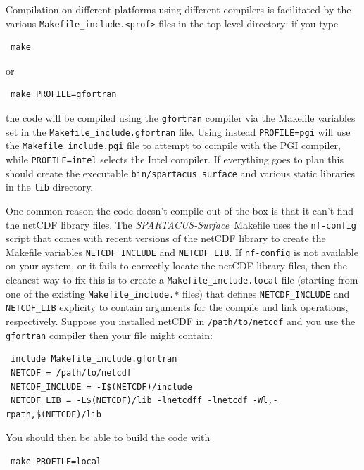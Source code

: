 \documentclass[a4,oneside]{article}
\def\codesize{\small}
\def\spsurf{\emph{SPARTACUS-Surface}}
\def\code#1{{\codesize\texttt{#1}}}
\begin{document}
Compilation on different platforms using different compilers is
facilitated by the various \code{Makefile\_include.<prof>} files in the
top-level directory: if you type
%
\begin{lstlisting}
 make
\end{lstlisting}
%
or
%
\begin{lstlisting}
 make PROFILE=gfortran
\end{lstlisting}
%
the code will be compiled using the \code{gfortran} compiler via the
Makefile variables set in the \code{Makefile\_include.gfortran}
file. Using instead \code{PROFILE=pgi} will use the
\code{Makefile\_include.pgi} file to attempt to compile with the PGI
compiler, while \code{PROFILE=intel} selects the Intel compiler.  If
everything goes to plan this should create the executable
\code{bin/spartacus\_surface} and various static libraries in the \code{lib}
directory.

One common reason the code doesn't compile out of the box is that it
can't find the netCDF library files.  The \spsurf\ Makefile uses the
\code{nf-config} script that comes with recent versions of the netCDF
library to create the Makefile variables \code{NETCDF\_INCLUDE} and
\code{NETCDF\_LIB}. If \code{nf-config} is not available on your
system, or it fails to correctly locate the netCDF library files, then
the cleanest way to fix this is to create a
\code{Makefile\_include.local} file (starting from one of the existing
\code{Makefile\_include.*} files) that defines \code{NETCDF\_INCLUDE}
and \code{NETCDF\_LIB} explicity to contain arguments for the compile
and link operations, respectively.  Suppose you installed netCDF in
\code{/path/to/netcdf} and you use the \code{gfortran} compiler then
your file might contain:
\begin{lstlisting}
 include Makefile_include.gfortran
 NETCDF = /path/to/netcdf
 NETCDF_INCLUDE = -I$(NETCDF)/include
 NETCDF_LIB = -L$(NETCDF)/lib -lnetcdff -lnetcdf -Wl,-rpath,$(NETCDF)/lib
\end{lstlisting}
You should then be able to build the code with
%
\begin{lstlisting}
 make PROFILE=local
\end{lstlisting}
%
\end{document}

